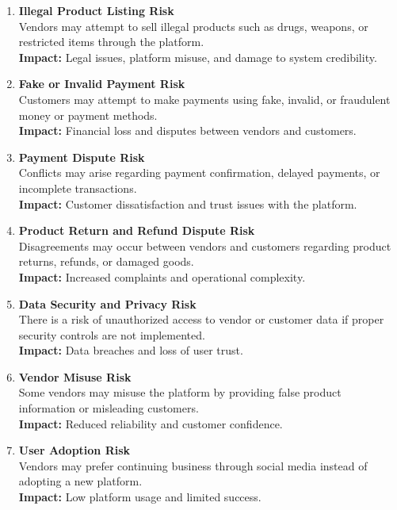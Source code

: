 \begin{enumerate}
    \item \textbf{Illegal Product Listing Risk} \\
    Vendors may attempt to sell illegal products such as drugs, weapons, or restricted items through the platform. \\
    \textbf{Impact:} Legal issues, platform misuse, and damage to system credibility.

    \item \textbf{Fake or Invalid Payment Risk} \\
    Customers may attempt to make payments using fake, invalid, or fraudulent money or payment methods. \\
    \textbf{Impact:} Financial loss and disputes between vendors and customers.

    \item \textbf{Payment Dispute Risk} \\
    Conflicts may arise regarding payment confirmation, delayed payments, or incomplete transactions. \\
    \textbf{Impact:} Customer dissatisfaction and trust issues with the platform.

    \item \textbf{Product Return and Refund Dispute Risk} \\
    Disagreements may occur between vendors and customers regarding product returns, refunds, or damaged goods. \\
    \textbf{Impact:} Increased complaints and operational complexity.

    \item \textbf{Data Security and Privacy Risk} \\
    There is a risk of unauthorized access to vendor or customer data if proper security controls are not implemented. \\
    \textbf{Impact:} Data breaches and loss of user trust.

    \item \textbf{Vendor Misuse Risk} \\
    Some vendors may misuse the platform by providing false product information or misleading customers. \\
    \textbf{Impact:} Reduced reliability and customer confidence.

    \item \textbf{User Adoption Risk} \\
    Vendors may prefer continuing business through social media instead of adopting a new platform. \\
    \textbf{Impact:} Low platform usage and limited success.


\end{enumerate}
